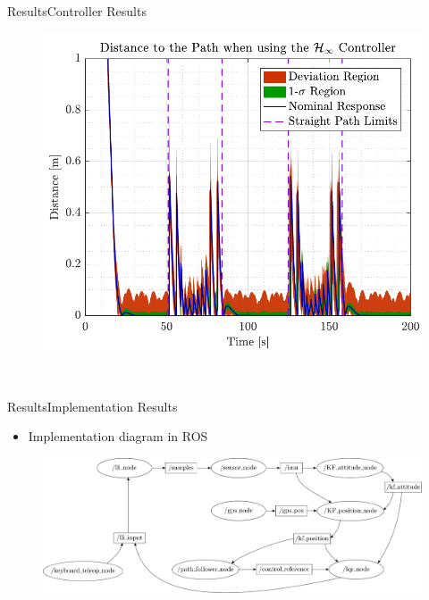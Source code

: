 \begin{frame}{Results}{Controller Results}
\begin{minipage}{0.5\linewidth}
\begin{figure}[H]
                \includegraphics[width=1\linewidth]{figures/dist_rob}
            \end{figure}             
        \end{minipage}\hfill \\    
\end{frame}

\begin{frame}{Results}{Implementation Results}
    \begin{itemize}
        \item Implementation diagram in ROS
    \end{itemize}
    \begin{figure}[H]
        \centering
        \includegraphics[width=1\textwidth]{figures/diagramROS}
    \end{figure}  
\end{frame}


